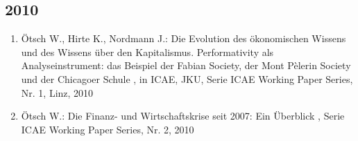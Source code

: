  \subsection*{2010} 
 \begin{enumerate}[leftmargin=*, labelsep=0.5cm] 
	 \item Ötsch W., Hirte K., Nordmann J.:  Die Evolution des ökonomischen Wissens und des Wissens über den Kapitalismus. Performativity als Analyseinstrument: das Beispiel der Fabian Society, der Mont Pèlerin Society und der Chicagoer Schule  , in ICAE, JKU, Serie ICAE Working Paper Series, Nr. 1, Linz, 2010
	 \item Ötsch W.:  Die Finanz-­ und Wirtschaftskrise seit 2007: Ein Überblick  , Serie ICAE Working Paper Series, Nr. 2, 2010
\end{enumerate}